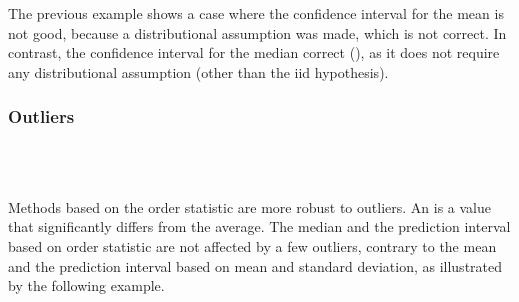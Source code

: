 The previous example shows a case where the
confidence interval for the mean is not good,
because a distributional assumption was made,
which is not correct. In contrast, the confidence
interval for the median  correct
(), as it does not require any
distributional assumption (other than the iid
hypothesis).
%
%
\subsubsection{Outliers}
%
\begin{figure}
\center
 \\
 \\
\end{figure}
%
Methods based on the order statistic are more
robust to outliers. An  is a value
that significantly differs from the average. The
median and the prediction interval based on order
statistic are not affected by a few outliers,
contrary to the mean and the prediction interval
based on mean and standard deviation, as
illustrated by the following example.
%
